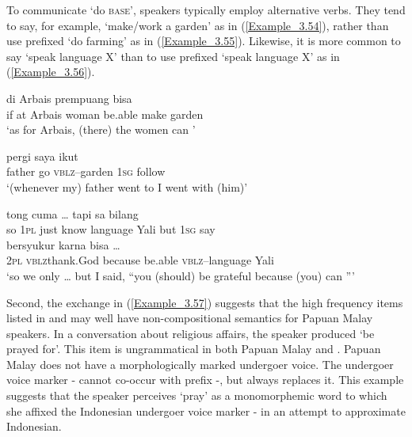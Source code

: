 To communicate ‘do \textsc{base}’, speakers typically employ alternative verbs. They tend to say, for example,  ‘make/work a garden’ as in (\ref{Example_3.54}), rather than use prefixed  ‘do farming’ as in (\ref{Example_3.55}). Likewise, it is more common to say  ‘speak language X’ than to use prefixed  ‘speak language X’ as in (\ref{Example_3.56}).

\ea
\label{Example_3.54}
 {di} {Arbais} {prempuang} {bisa} {} {}\\ %
 if  at  Arbais  woman  be.able  make  garden\\
\glt 
‘as for Arbais, (there) the women can ’ \textstyleExampleSource{[081014-007-CvEx.0035]}\\
\z

\ea
\label{Example_3.55}
 {pergi} {} {saya} {ikut}\\ %
 father  go  \textsc{vblz}–garden  \textsc{1sg}  follow\\
\glt 
‘(whenever my) father went to  I went with (him)’ \textstyleExampleSource{[081110-008-CvNP.0002]}\\
\z

\ea
\label{Example_3.56}
 {{tong}} {cuma} {{}} {{}} {} {{\ldots}} {{tapi}} {sa} {{bilang}}\\ %
 so  {\textsc{1pl}}  just  {know}  {language}  Yali  {}  {but}  \textsc{1sg}  {say}\\
  {bersyukur}  {karna}  {bisa}  {\ldots}  {}  \\
 {\textsc{2pl}}  {\textsc{vblz}thank.God}  {because}  {be.able}  {}  {\textsc{vblz}–language}  Yali\\
\glt 
`so we only  {\ldots} but I said, ``you (should) be grateful because (you) can ''' \textstyleExampleSource{[081011-022-Cv.0101/0184]}
\z


Second, the exchange in (\ref{Example_3.57}) suggests that the high frequency items listed in  and  may well have non-compositional semantics for Papuan Malay speakers. In a conversation about religious affairs, the speaker produced  ‘be prayed for’. This item is ungrammatical in both Papuan Malay and . Papuan Malay does not have a morphologically marked undergoer voice. The  undergoer voice marker - cannot co-occur with prefix -, but always replaces it. This example suggests that the speaker perceives  ‘pray’ as a monomorphemic word to which she affixed the Indonesian undergoer voice marker - in an attempt to approximate Indonesian.


